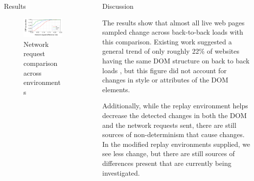 \documentclass[final]{beamer}
\newlength{\sepwid}
\newlength{\onecolwid}
\begin{document}
\begin{frame}[t]
\begin{columns}[t]
\begin{column}{\onecolwid}
\begin{block}{Results}
\begin{figure}
\vspace{0.5cm}
\includegraphics[width=0.8\linewidth]{network_plot.png}
\vspace{-1.5cm}
\caption{Network request comparison across environments}
\end{figure}

\end{block}


\end{column} %

\begin{column}{\sepwid}\end{column} %

\begin{column}{\onecolwid} %


\begin{block}{Discussion}

The results show that almost all live web pages sampled change across back-to-back loads with this comparison. Existing work suggested a general trend of only roughly 22\% of websites having the same DOM structure on back to back loads \cite{ruamviboonsuk_netravali_uluyol_madhyastha_2017}, but this figure did not account for changes in style or attributes of the DOM elements.

Additionally, while the replay environment helps decrease the detected changes in both the DOM  and the network requests sent, there are still sources of non-determinism that cause changes. In the modified replay environments supplied, we see less change, but there are still sources of differences present that are currently being investigated. 


\end{block}
\end{column}
\end{columns}
\end{frame}
\end{document}

